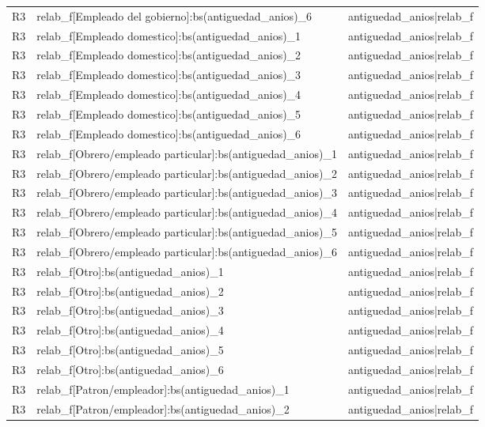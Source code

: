 \begin{longtable}{lll}
R3 & relab\_f[Empleado del gobierno]:bs(antiguedad\_anios)\_6 & antiguedad\_anios|relab\_f \\
R3 & relab\_f[Empleado domestico]:bs(antiguedad\_anios)\_1 & antiguedad\_anios|relab\_f \\
R3 & relab\_f[Empleado domestico]:bs(antiguedad\_anios)\_2 & antiguedad\_anios|relab\_f \\
R3 & relab\_f[Empleado domestico]:bs(antiguedad\_anios)\_3 & antiguedad\_anios|relab\_f \\
R3 & relab\_f[Empleado domestico]:bs(antiguedad\_anios)\_4 & antiguedad\_anios|relab\_f \\
R3 & relab\_f[Empleado domestico]:bs(antiguedad\_anios)\_5 & antiguedad\_anios|relab\_f \\
R3 & relab\_f[Empleado domestico]:bs(antiguedad\_anios)\_6 & antiguedad\_anios|relab\_f \\
R3 & relab\_f[Obrero/empleado particular]:bs(antiguedad\_anios)\_1 & antiguedad\_anios|relab\_f \\
R3 & relab\_f[Obrero/empleado particular]:bs(antiguedad\_anios)\_2 & antiguedad\_anios|relab\_f \\
R3 & relab\_f[Obrero/empleado particular]:bs(antiguedad\_anios)\_3 & antiguedad\_anios|relab\_f \\
R3 & relab\_f[Obrero/empleado particular]:bs(antiguedad\_anios)\_4 & antiguedad\_anios|relab\_f \\
R3 & relab\_f[Obrero/empleado particular]:bs(antiguedad\_anios)\_5 & antiguedad\_anios|relab\_f \\
R3 & relab\_f[Obrero/empleado particular]:bs(antiguedad\_anios)\_6 & antiguedad\_anios|relab\_f \\
R3 & relab\_f[Otro]:bs(antiguedad\_anios)\_1 & antiguedad\_anios|relab\_f \\
R3 & relab\_f[Otro]:bs(antiguedad\_anios)\_2 & antiguedad\_anios|relab\_f \\
R3 & relab\_f[Otro]:bs(antiguedad\_anios)\_3 & antiguedad\_anios|relab\_f \\
R3 & relab\_f[Otro]:bs(antiguedad\_anios)\_4 & antiguedad\_anios|relab\_f \\
R3 & relab\_f[Otro]:bs(antiguedad\_anios)\_5 & antiguedad\_anios|relab\_f \\
R3 & relab\_f[Otro]:bs(antiguedad\_anios)\_6 & antiguedad\_anios|relab\_f \\
R3 & relab\_f[Patron/empleador]:bs(antiguedad\_anios)\_1 & antiguedad\_anios|relab\_f \\
R3 & relab\_f[Patron/empleador]:bs(antiguedad\_anios)\_2 & antiguedad\_anios|relab\_f \\

\end{longtable}
